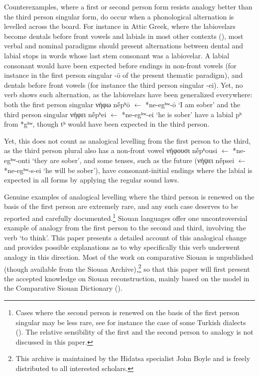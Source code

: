 \documentclass[oneside,a4paper,11pt]{article}
\newcommand{\ipa}[1]{{\phon#1}} %
\newcommand{\grec}[1]{{\mleccha #1}}
\begin{document}
Counterexamples, where a first or second person form resists analogy better than the third person singular form, do occur when a phonological alternation is levelled across the board. For instance in Attic Greek,  where  the labiovelars become dentals before front vowels and labials in most other contexts (\citealt[253]{fortson10intro}), most verbal and nominal paradigms should present alternations between dental and labial stops in words whose last stem consonant was a labiovelar. A labial consonant would have been expected before endings in non-front vowels (for instance in the  first person singular \ipa{-ō} of the present thematic paradigm), and  dentals before front vowels (for instance the third person singular \ipa{-ei}). Yet, no  verb shows such alternation, as the labiovelars have been generalized everywhere:  both the first person singular \grec{νήφω} \ipa{nḗpʰō}  $\leftarrow $ *\ipa{ne-egʰʷ-ō} `I am sober' and the third person singular \grec{νήφει} \ipa{nḗpʰei}  $\leftarrow $ *\ipa{ne-egʰʷ-ei} `he is sober' have a labial \ipa{pʰ} from *\ipa{gʰʷ}, though \ipa{tʰ} would have been expected in the third person. 

Yet, this does not count as analogical levelling from the first person to the third, as the third person plural also has a non-front vowel \grec{νήφουσι} \ipa{nḗpʰousi}  $\leftarrow $ *\ipa{ne-egʰʷ-onti} `they are sober', and some tenses, such as the future (\grec{νήψει} \ipa{nḗpsei} $\leftarrow $ *\ipa{ne-egʰʷ-s-ei} `he will be sober'), have consonant-initial endings where the labial is expected in all forms by applying the regular sound laws.

Genuine examples of analogical levelling where the third person is renewed on the basis of the first person are extremely rare, and any such case deserves to be reported and carefully documented.\footnote{Cases where the second person is renewed on the basis of the first person singular may be less rare, see for instance the case of some Turkish dialects (\citealt{saygin02reanalysis}). The relative sensibility of the first and the second person to analogy is not discussed in this paper.}  Siouan languages offer one uncontroversial example  of analogy from the first person to the second and third,  involving the verb `to think'. This paper presents a detailed account of this analogical change and provides possible explanations as to why specifically this verb underwent analogy in this direction. Most of the work on comparative Siouan is unpublished (though available from the Siouan Archive),\footnote{This archive is maintained by the Hidatsa specialist John Boyle and  is freely distributed to all interested scholars.} so that this paper will first present the accepted knowledge on Siouan reconstruction, mainly based on the model in the Comparative Siouan Dictionary (\citealt{csd2006}). 
\end{document}
